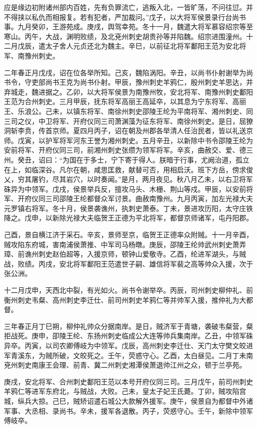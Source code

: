 \documentclass[12pt,UTF8]{ctexbook}
\begin{document}
应是缘边初附诸州部内百姓，先有负罪流亡，逃叛入北，一皆旷荡，不问往愆。并不得挟以私仇而相报复。若有犯者，严加裁问。”戊子，以大将军侯景录行台尚书事。九月癸卯，王游苑成。庚戌，舆驾幸苑。冬十一月，魏遣大将军慕容绍宗等至寒山。丙午，大战，渊明败绩，及北兗州刺史胡贵孙等并陷魏。绍宗进围潼州。十二月戊辰，遣太子舍人元贞还北为魏主。辛巳，以前征北将军鄱阳王范为安北将军、南豫州刺史。

二年春正月戊戌，诏在位各举所知。己亥，魏陷涡阳。辛丑，以尚书仆射谢举为尚书令，守吏部尚书王克为尚书仆射。甲辰，豫州刺史羊鸦仁，殷州刺史羊思达，并弃城走，魏进据之。乙卯，以大将军侯景为南豫州牧，安北将军、南豫州刺史鄱阳王范为合州刺史。三月甲辰，抚东将军高丽王高延卒，以其息为宁东将军、高丽王、乐浪公。己未，以镇东将军、南徐州刺史邵陵王纶为平南将军、湘州刺史、同三司之仪，中卫将军、开府仪同三司萧渊藻为征东将军、南徐州刺史。是日，屈獠洞斩李贲，传首京师。夏四月丙子，诏在朝及州郡各举清人任治民者，皆以礼送京师。戊寅，以护军将军河东王誉为湘州刺史。五月辛丑，以新除中书令邵陵王纶为安前将军、开府仪同三司，前湘州刺史张缵为领军将军。辛亥，曲赦交、爱、德三州。癸丑，诏曰：“为国在于多士，宁下寄于得人。朕暗于行事，尤阙治道，孤立在上，如临深谷。凡尔在朝，咸思匡救，献替可否，用相启沃。班下方岳，傍求俊乂，穷其屠钓，尽其岩穴，以时奏闻。”是月，两月夜见。秋八月乙未，以右卫将军硃异为中领军。戊戌，侯景举兵反，擅攻马头、木栅、荆山等戍。甲辰，以安前将军、开府仪同三司邵陵王纶都督众军讨景。曲赦南豫州。九月丙寅，加左光禄大夫元罗镇右将军。冬十月，侯景袭谯州，执刺史萧泰。丁未，景进攻历阳，太守庄铁降之。戊申，以新除光禄大夫临贺王正德为平北将军，都督京师诸军，屯丹阳郡。

己酉，景自横江济于采石。辛亥，景师至京，临贺王正德率众附贼。十一月辛酉，贼攻陷东府城，害南浦侯萧推、中军司马杨暾。庚辰，邵陵王纶帅武州刺史萧弄璋、前谯州刺史赵伯超等，入援京师，顿钟山爱敬寺。乙酉，纶进军湖头，与贼战，败绩。丙戌，安北将军鄱阳王范遣世子嗣、雄信将军裴之高等帅众入援，次于张公洲。

十二月戊申，天西北中裂，有光如火。尚书令谢举卒。丙辰，司州刺史柳仲礼、前衡州刺史韦粲、高州刺史李迁仕、前司州刺史羊鸦仁等并帅军入援，推仲礼为大都督。

三年春正月丁巳朔，柳仲礼帅众分据南岸。是日，贼济军于青塘，袭破韦粲营，粲拒战死。庚申，卲陵王纶、东扬州刺史临成公大连等帅兵集南岸。乙丑，中领军硃异卒。丙寅，以司农卿傅岐为中领军。戊辰，高州刺史李迁仕、天门太守樊文皎进军青溪东，为贼所破，文皎死之。壬午，荧惑守心。乙酉，太白昼见。二月丁未南兗州刺史南康王会理、前青、冀二州刺史湘潭侯萧退帅江州之众，顿于兰亭苑。

庚戌，安北将军、合州刺史鄱阳王范以本号开府仪同三司。三月戊午，前司州刺史羊鸦仁等进军东府北，与贼战，大败。己未，皇太子妃王氏薨。丁卯，贼攻陷宫城，纵兵大掠。己巳，贼矫诏遣石城公大款解外援军。庚午，侯景自为都督中外诸军事、大丞相、录尚书。辛未，援军各退散。丙子，荧惑守心。壬午，新除中领军傅岐卒。
\end{document}
